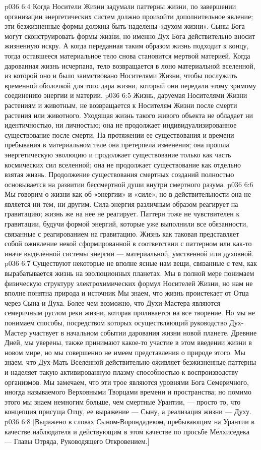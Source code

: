 \vs p036 6:4 \pc Когда Носители Жизни задумали паттерны жизни, по завершении организации энергетических систем должно произойти дополнительное явление; эти безжизненные формы должны быть наделены «духом жизни». Сыны Бога могут сконструировать формы жизни, но именно Дух Бога действительно вносит жизненную искру. А когда переданная таким образом жизнь подходит к концу, тогда оставшееся материальное тело снова становится мертвой материей. Когда дарованная жизнь исчерпана, тело возвращается в лоно материальной вселенной, из которой оно и было заимствовано Носителями Жизни, чтобы послужить временной оболочкой для того дара жизни, который они передали этому зримому соединению энергии и материи.
\vs p036 6:5 Жизнь, даруемая Носителями Жизни растениям и животным, не возвращается к Носителям Жизни после смерти растения или животного. Уходящая жизнь такого живого объекта не обладает ни идентичностью, ни личностью; она не продолжает индивидуализированное существование после смерти. На протяжении ее существования и времени пребывания в материальном теле она претерпела изменения; она прошла энергетическую эволюцию и продолжает существование только как часть космических сил вселенной; она не продолжает существование как отдельно взятая жизнь. Продолжение существования смертных созданий полностью основывается на развитии бессмертной души внутри смертного разума.
\vs p036 6:6 \pc Мы говорим о жизни как об «энергии» и «силе», но в действительности она не является ни тем, ни другим. Сила\hyp{}энергия различным образом реагирует на гравитацию; жизнь же на нее не реагирует. Паттерн тоже не чувствителен к гравитации, будучи формой энергий, которые уже выполнили все обязанности, связанные с реагированием на гравитацию. Жизнь как таковая представляет собой оживление некой сформированной в соответствии с паттерном или как\hyp{}то иначе выделенной системы энергии --- материальной, умственной или духовной.
\vs p036 6:7 \pc Существуют некоторые не вполне ясные нам вещи, связанные с тем, как вырабатывается жизнь на эволюционных планетах. Мы в полной мере понимаем физическую структуру электрохимических формул Носителей Жизни, но нам не вполне понятна природа и источник   Мы знаем, что жизнь проистекает от Отца через Сына и  Духа. Более чем возможно, что Духи\hyp{}Мастера являются семеричным руслом реки жизни, которая проливается на все творение. Но мы не понимаем способы, посредством которых осуществляющий руководство Дух\hyp{}Мастер участвует в начальном событии дарования жизни новой планете. Древние Дней, мы уверены, также принимают какое\hyp{}то участие в этом введении жизни в новом мире, но мы совершенно не имеем представления о природе этого. Мы знаем, что Дух\hyp{}Мать Вселенной действительно оживляет безжизненные паттерны и наделяет такую активированную плазму способностью к воспроизводству организмов. Мы замечаем, что эти трое являются уровнями Бога Семеричного, иногда называемого Верховными Творцами времени и пространства; но помимо этого мы знаем немногим больше, чем смертные Урантии, --- просто то, что концепция присуща Отцу, ее выражение --- Сыну, а реализация жизни --- Духу.
\vsetoff
\vs p036 6:8 [Выражено в словах Сыном\hyp{}Ворондадеком, пребывающим на Урантии в качестве наблюдателя и действующим в этом качестве по просьбе Мелхиседека --- Главы Отряда, Руководящего Откровением.]
